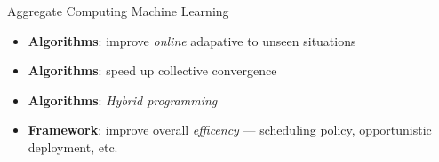\begin{frame}{Aggregate Computing \faPlus[left] Machine Learning~\cite{research}}
  \begin{card}[Why?]
    \begin{itemize} 
      \item \textbf{Algorithms}: improve \textit{online} adapative to unseen situations
      \item \textbf{Algorithms}: speed up collective convergence
      \item \textbf{Algorithms}: \textit{Hybrid programming}
      \item \textbf{Framework}: improve overall \textit{efficency} --- scheduling policy, opportunistic deployment, etc.
    \end{itemize}
  \end{card}
\end{frame}
